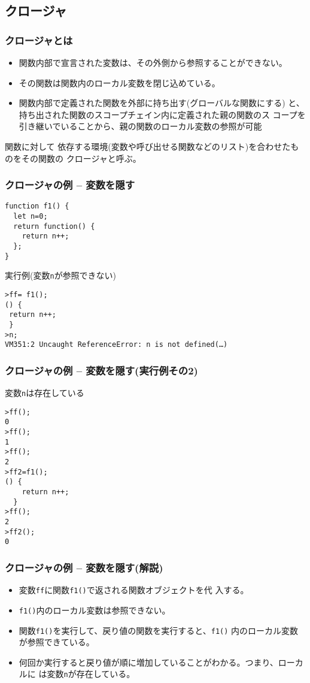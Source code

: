 \subsection{クロージャ}
\begin{frame}[containsverbatim]
\frametitle{クロージャとは}
\begin{itemize}
 \item 関数内部で宣言された変数は、その外側から参照することができない。
 \item その関数は関数内のローカル変数を閉じ込めている。
 \item 関数内部で定義された関数を外部に持ち出す(グローバルな関数にする)
       と、持ち出された関数のスコープチェイン内に定義された親の関数のス
       コープを引き継いでいることから、親の関数のローカル変数の参照が可能
\end{itemize}
関数に対して
依存する環境(変数や呼び出せる関数などのリスト)を合わせたものをその関数の
クロージャと呼ぶ。
\end{frame}
\begin{frame}[containsverbatim]
\frametitle{クロージャの例 -- 変数を隠す}
\begin{Verbatim}
function f1() {
  let n=0;
  return function() {
    return n++;
  };
}
\end{Verbatim}
 実行例(変数\Verb+n+が参照できない)
\begin{Verbatim}
>ff= f1();
() {
 return n++;
 }
>n;
VM351:2 Uncaught ReferenceError: n is not defined(…)
\end{Verbatim}
\end{frame}
\begin{frame}[containsverbatim]
\frametitle{クロージャの例 -- 変数を隠す(実行例その2)}
 変数\Verb+n+は存在している
\begin{Verbatim}
>ff();
0
>ff();
1
>ff();
2
>ff2=f1();
() {
    return n++;
  }
>ff();
2
>ff2();
0
\end{Verbatim}
 \end{frame}
\begin{frame}[containsverbatim]
\frametitle{クロージャの例 -- 変数を隠す(解説)}
\begin{itemize}
 \item 変数\texttt{ff}に関数\texttt{f1()}で返される関数オブジェクトを代
       入する。
 \item \texttt{f1()}内のローカル変数は参照できない。
 \item 関数\Verb+f1()+を実行して、戻り値の関数を実行すると、\Verb+f1()+
       内のローカル変数が参照できている。
 \item 何回か実行すると戻り値が順に増加していることがわかる。つまり、ローカルに
は変数\texttt{n}が存在している。
\end{itemize}
\end{frame}
